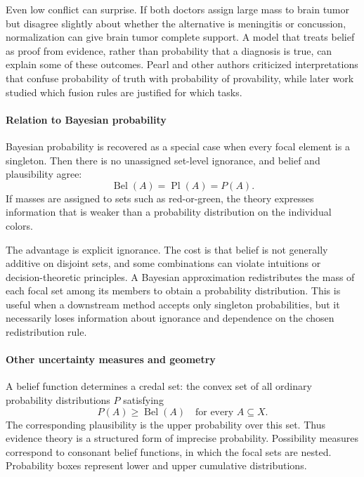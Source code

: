 Even low conflict can surprise. If both doctors assign large mass to brain tumor but disagree slightly about whether the alternative is meningitis or concussion, normalization can give brain tumor complete support. A model that treats belief as proof from evidence, rather than probability that a diagnosis is true, can explain some of these outcomes. Pearl and other authors criticized interpretations that confuse probability of truth with probability of provability, while later work studied which fusion rules are justified for which tasks. \cite{dempster_shafer_theory_ref6,dempster_shafer_theory_ref7}

\paragraph{Relation to Bayesian probability}

Bayesian probability is recovered as a special case when every focal element is a singleton. Then there is no unassigned set-level ignorance, and belief and plausibility agree:
\[
 \operatorname{Bel}(A)=\operatorname{Pl}(A)=P(A).
\]
If masses are assigned to sets such as red-or-green, the theory expresses information that is weaker than a probability distribution on the individual colors.

The advantage is explicit ignorance. The cost is that belief is not generally additive on disjoint sets, and some combinations can violate intuitions or decision-theoretic principles. A Bayesian approximation redistributes the mass of each focal set among its members to obtain a probability distribution. This is useful when a downstream method accepts only singleton probabilities, but it necessarily loses information about ignorance and dependence on the chosen redistribution rule. \cite{dempster_shafer_theory_ref2,dempster_shafer_theory_ref8}

\paragraph{Other uncertainty measures and geometry}

A belief function determines a credal set: the convex set of all ordinary probability distributions $P$ satisfying
\[
 P(A)\geq\operatorname{Bel}(A)\quad\text{for every }A\subseteq X.
\]
The corresponding plausibility is the upper probability over this set. Thus evidence theory is a structured form of imprecise probability. Possibility measures correspond to consonant belief functions, in which the focal sets are nested. Probability boxes represent lower and upper cumulative distributions.

